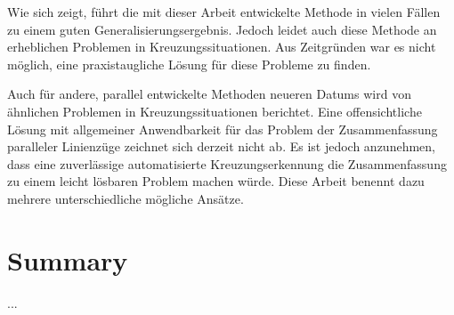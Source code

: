 \documentclass[../main/thesis.tex]{subfiles}
\begin{document}
Wie sich zeigt, führt die mit dieser Arbeit entwickelte Methode in vielen Fällen zu einem guten Generalisierungsergebnis.
Jedoch leidet auch diese Methode an erheblichen Problemen in Kreuzungssituationen.
Aus Zeitgründen war es nicht möglich, eine praxistaugliche Lösung für diese Probleme zu finden.


Auch für andere, parallel entwickelte Methoden neueren Datums wird von ähnlichen Problemen in Kreuzungssituationen berichtet.
Eine offensichtliche Lösung mit allgemeiner Anwendbarkeit für das Problem der Zusammenfassung paralleler Linienzüge zeichnet sich derzeit nicht ab.
Es ist jedoch anzunehmen, dass eine zuverlässige automatisierte Kreuzungserkennung die Zusammenfassung zu einem leicht lösbaren Problem machen würde.
Diese Arbeit benennt dazu mehrere unterschiedliche mögliche Ansätze.



\chapter*{Summary}

...



\end{document}

